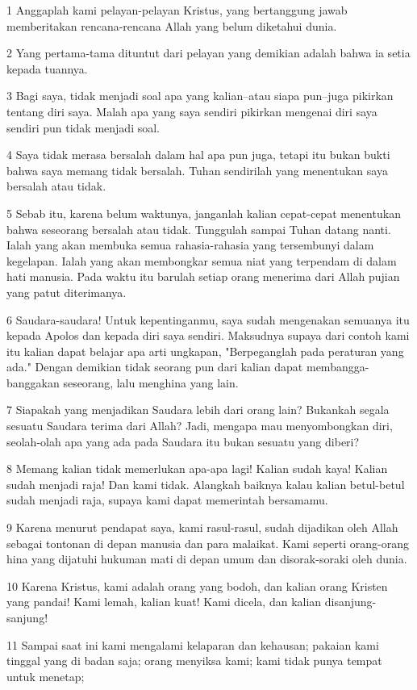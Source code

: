 \par 1 Anggaplah kami pelayan-pelayan Kristus, yang bertanggung jawab memberitakan rencana-rencana Allah yang belum diketahui dunia.
\par 2 Yang pertama-tama dituntut dari pelayan yang demikian adalah bahwa ia setia kepada tuannya.
\par 3 Bagi saya, tidak menjadi soal apa yang kalian--atau siapa pun--juga pikirkan tentang diri saya. Malah apa yang saya sendiri pikirkan mengenai diri saya sendiri pun tidak menjadi soal.
\par 4 Saya tidak merasa bersalah dalam hal apa pun juga, tetapi itu bukan bukti bahwa saya memang tidak bersalah. Tuhan sendirilah yang menentukan saya bersalah atau tidak.
\par 5 Sebab itu, karena belum waktunya, janganlah kalian cepat-cepat menentukan bahwa seseorang bersalah atau tidak. Tunggulah sampai Tuhan datang nanti. Ialah yang akan membuka semua rahasia-rahasia yang tersembunyi dalam kegelapan. Ialah yang akan membongkar semua niat yang terpendam di dalam hati manusia. Pada waktu itu barulah setiap orang menerima dari Allah pujian yang patut diterimanya.
\par 6 Saudara-saudara! Untuk kepentinganmu, saya sudah mengenakan semuanya itu kepada Apolos dan kepada diri saya sendiri. Maksudnya supaya dari contoh kami itu kalian dapat belajar apa arti ungkapan, "Berpeganglah pada peraturan yang ada." Dengan demikian tidak seorang pun dari kalian dapat membangga-banggakan seseorang, lalu menghina yang lain.
\par 7 Siapakah yang menjadikan Saudara lebih dari orang lain? Bukankah segala sesuatu Saudara terima dari Allah? Jadi, mengapa mau menyombongkan diri, seolah-olah apa yang ada pada Saudara itu bukan sesuatu yang diberi?
\par 8 Memang kalian tidak memerlukan apa-apa lagi! Kalian sudah kaya! Kalian sudah menjadi raja! Dan kami tidak. Alangkah baiknya kalau kalian betul-betul sudah menjadi raja, supaya kami dapat memerintah bersamamu.
\par 9 Karena menurut pendapat saya, kami rasul-rasul, sudah dijadikan oleh Allah sebagai tontonan di depan manusia dan para malaikat. Kami seperti orang-orang hina yang dijatuhi hukuman mati di depan umum dan disorak-soraki oleh dunia.
\par 10 Karena Kristus, kami adalah orang yang bodoh, dan kalian orang Kristen yang pandai! Kami lemah, kalian kuat! Kami dicela, dan kalian disanjung-sanjung!
\par 11 Sampai saat ini kami mengalami kelaparan dan kehausan; pakaian kami tinggal yang di badan saja; orang menyiksa kami; kami tidak punya tempat untuk menetap;
